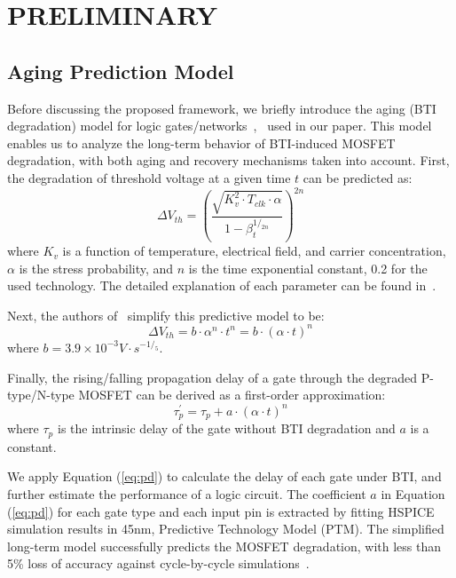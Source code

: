 \section{PRELIMINARY}
\label{sec:preliminary}

\subsection{Aging Prediction Model}
\label{subsec:apm}
Before discussing the proposed framework, we briefly introduce the aging (BTI degradation) model for logic gates/networks~\cite{wang2010impact},~\cite{wang2007efficient} used in our paper. This model enables us to analyze the long-term behavior of BTI-induced MOSFET degradation, with both aging and recovery mechanisms taken into account. First, the degradation of threshold voltage at a given time $t$ can be predicted as:
\begin{equation}
\label{eq:dtv}
\Delta V_{th}=\left(\frac{\sqrt{K_v^2 \cdot T_{clk} \cdot \alpha}}{1-\beta_t^{1/_{2n}}}\right)^{2n}
\end{equation}
where $K_v$ is a function of temperature, electrical field, and carrier concentration, $\alpha$ is the stress probability, and $n$ is the time exponential constant, 0.2 for the used technology. The detailed explanation of each parameter can be found in~\cite{wang2010impact}.

Next, the authors of~\cite{wang2007efficient} simplify this predictive model to be:
\begin{equation}
\label{eq:dtv2}
\Delta V_{th}=b\cdot  \alpha^n \cdot t^n = b \cdot \left(\alpha \cdot t \right)^n
\end{equation}
where $b = 3.9 \times 10^{-3} V \cdot s^{-1/_5}$.

Finally, the rising/falling propagation delay of a gate through the degraded P-type/N-type MOSFET can be derived as a first-order approximation:
\begin{equation}
\label{eq:pd}
\tau_p^\prime = \tau_p + a \cdot \left(\alpha \cdot  t\right)^n
\end{equation}
where $\tau_p$ is the intrinsic delay of the gate without BTI degradation and $a$ is a constant.

We apply Equation (\ref{eq:pd}) to calculate the delay of each gate under BTI, and further estimate the performance of a logic circuit. The coefficient $a$ in Equation (\ref{eq:pd}) for each gate type and each input pin is extracted by fitting HSPICE simulation results in 45nm, Predictive Technology Model (PTM). The simplified long-term model successfully predicts the MOSFET degradation, with less than 5\% loss of accuracy against cycle-by-cycle simulations~\cite{wang2010impact}.

